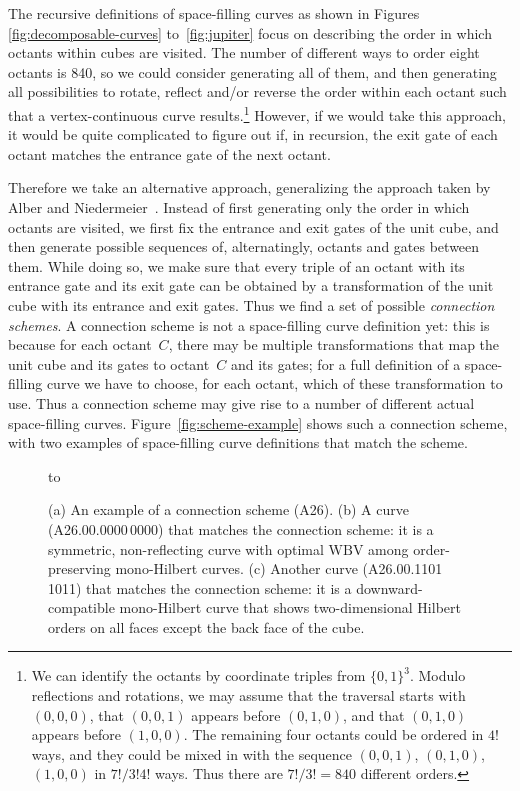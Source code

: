 \documentclass[11pt,a4paper]{article}
\def\WBV{\ensuremath{\mathrm{WBV}}\xspace}
\begin{document}
The recursive definitions of space-filling curves as shown in Figures \ref{fig:decomposable-curves} to~\ref{fig:jupiter} focus on describing the order in which octants within cubes are visited. The number of different ways to order eight octants is 840, so we could consider generating all of them, and then generating all possibilities to rotate, reflect and/or reverse the order within each octant such that a vertex-continuous curve results.\footnote{We can identify the octants by coordinate triples from $\{0,1\}^3$. Modulo reflections and rotations, we may assume that the traversal starts with $(0,0,0)$, that $(0,0,1)$ appears before $(0,1,0)$, and that $(0,1,0)$ appears before $(1,0,0)$. The remaining four octants could be ordered in $4!$ ways, and they could be mixed in with the sequence $(0,0,1)$, $(0,1,0)$, $(1,0,0)$ in $7!/3!4!$ ways. Thus there are $7!/3! = 840$ different orders.}
However, if we would take this approach, it would be quite complicated to figure out if, in recursion, the exit gate of each octant matches the entrance gate of the next octant.

Therefore we take an alternative approach, generalizing the approach taken by Alber and Niedermeier~\cite{Alber}. Instead of first generating only the order in which octants are visited, we first fix the entrance and exit gates of the unit cube, and then generate possible sequences of, alternatingly, octants and gates between them. While doing so, we make sure that every triple of an octant with its entrance gate and its exit gate can be obtained by a transformation of the unit cube with its entrance and exit gates. Thus we find a set of possible \emph{connection schemes}. A connection scheme is not a space-filling curve definition yet: this is because for each octant~$C$, there may be multiple transformations that map the unit cube and its gates to octant~$C$ and its gates; for a full definition of a space-filling curve we have to choose, for each octant, which of these transformation to use. Thus a connection scheme may give rise to a number of different actual space-filling curves. Figure~\ref{fig:scheme-example} shows such a connection scheme, with two examples of space-filling curve definitions that match the scheme.

\begin{figure}
\centering
\hbox to 
\caption{(a) An example of a connection scheme (A26). (b)  A curve (A26.00.0000\,0000) that matches the connection scheme: it is a symmetric, non-reflecting curve with optimal \WBV among order-preserving mono-Hilbert curves. (c) Another curve (A26.00.1101\,1011) that matches the connection scheme: it is a downward-compatible mono-Hilbert curve that shows two-dimensional Hilbert orders on all faces except the back face of the cube.}
\label{fig:scheme-example}\label{fig:A26-curves}
\end{figure}
\end{document}

